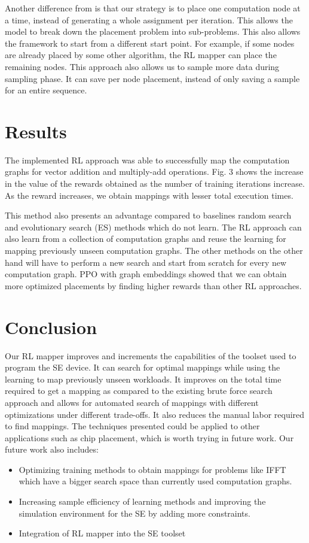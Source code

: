 \documentclass[sigplan,screen]{acmart}
\begin{document}
Another difference from \cite{zhou2019gdp}  is that our strategy is to place one computation node at a time, instead of generating a whole assignment per iteration. This allows the model to break down the placement problem into sub-problems. This also allows the framework to start from a different start point. For example, if some nodes are already placed by some other algorithm, the RL mapper can place the remaining nodes. This approach also allows us to sample more data during sampling phase. It can save per node placement, instead of only saving a sample for an entire sequence.  

\section{Results}

The implemented RL approach was able to successfully map the computation graphs for vector addition and multiply-add operations. Fig. 3 shows the increase in the value of the rewards obtained as the number of training iterations increase. As the reward increases, we obtain mappings with lesser total execution times. 

This method also presents an advantage compared to baselines random search and evolutionary search (ES) methods which do not learn. The RL approach can also learn from a collection of computation graphs and reuse the learning for mapping previously unseen computation graphs. The other methods on the other hand will have to perform a new search and start from scratch for every new computation graph. PPO with graph embeddings showed that we can obtain more optimized placements by finding higher rewards than other RL approaches. 


\section{Conclusion}

Our RL mapper improves and increments the capabilities of the toolset used to program the SE device. It can search for optimal mappings while using the learning to map previously unseen workloads. It improves on the total time required to get a mapping as compared to the existing brute force search approach and allows for automated search of mappings with different optimizations under different trade-offs. It also reduces the manual labor required to find mappings. The techniques presented could be applied to other applications such as chip placement, which is worth trying in future work. Our future work also includes: 
\begin{itemize}
\item Optimizing training methods to obtain mappings for problems like IFFT which have a bigger search space than currently used computation graphs. 
\item Increasing sample efficiency of learning methods and improving the simulation environment for the SE by adding more constraints. 
\item Integration of RL mapper into the SE toolset 
\end{itemize}
\end{document}
